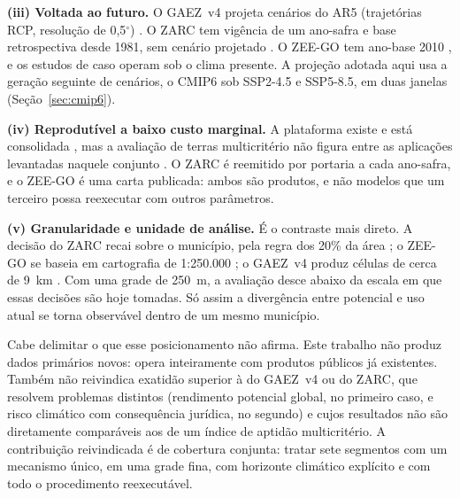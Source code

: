 \textbf{(iii) Voltada ao futuro.} O GAEZ~v4 projeta cenários do AR5 (trajetórias RCP, resolução de
0,5$^\circ$) \citep[p.~15]{fischer_global_2021}. O ZARC tem vigência de um ano-safra
\citep[art.~1º, parágrafo único]{mapa_port_2026} e base retrospectiva desde 1981,
sem cenário projetado \citep[p.~13]{amaral_metodologia_2023}. O ZEE-GO tem ano-base 2010
\citep[p.~2327]{queiroz_o_2022}, e os estudos de caso operam sob o clima presente. A projeção adotada
aqui usa a geração seguinte de cenários, o CMIP6 sob SSP2-4.5 e SSP5-8.5, em duas janelas
(Seção~\ref{sec:cmip6}).

\textbf{(iv) Reprodutível a baixo custo marginal.} A plataforma existe e está consolidada
\citep[p.~152]{tamiminia_google_2020}, mas a avaliação de terras multicritério não figura entre as
aplicações levantadas naquele conjunto \citep[Tabela~1]{tamiminia_google_2020}. O ZARC é reemitido por
portaria a cada ano-safra, e o ZEE-GO é uma carta publicada: ambos são produtos, e não modelos que um
terceiro possa reexecutar com outros parâmetros.

\textbf{(v) Granularidade e unidade de análise.} É o contraste mais direto. A decisão do ZARC recai
sobre o município, pela regra dos 20\% da área \citep[§1.10]{mapa_port_2026}; o ZEE-GO se baseia em
cartografia de 1:250.000 \citep[p.~2323]{queiroz_o_2022}; o GAEZ~v4 produz células de cerca de
9~km \citep[p.~8]{fischer_global_2021}. Com uma grade de 250~m, a avaliação desce abaixo da escala em
que essas decisões são hoje tomadas. Só assim a divergência entre potencial e uso atual se torna
observável dentro de um mesmo município.

Cabe delimitar o que esse posicionamento não afirma. Este trabalho não produz dados primários novos:
opera inteiramente com produtos públicos já existentes. Também não reivindica exatidão superior à do
GAEZ~v4 ou do ZARC, que resolvem problemas distintos (rendimento potencial global, no primeiro caso, e
risco climático com consequência jurídica, no segundo) e cujos resultados não são diretamente
comparáveis aos de um índice de aptidão multicritério. A contribuição reivindicada é de cobertura
conjunta: tratar sete segmentos com um mecanismo único, em uma grade fina, com horizonte climático
explícito e com todo o procedimento reexecutável.
